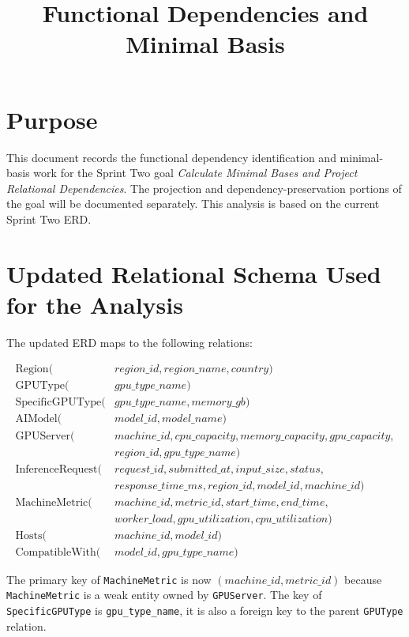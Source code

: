 \documentclass[11pt]{article}
\title{Functional Dependencies and Minimal Basis}
\author{}
\date{}
\newcommand{\code}[1]{\texttt{#1}}
\begin{document}
\maketitle

\section{Purpose}

This document records the functional dependency identification and minimal-basis
work for the Sprint Two goal \emph{Calculate Minimal Bases and Project Relational
Dependencies}. The projection and dependency-preservation portions of the goal
will be documented separately. This analysis is based on the current Sprint Two
ERD.


\section{Updated Relational Schema Used for the Analysis}

The updated ERD maps to the following relations:

\begin{align*}
\text{Region}(&region\_id, region\_name, country)\\
\text{GPUType}(&gpu\_type\_name)\\
\text{SpecificGPUType}(&gpu\_type\_name, memory\_gb)\\
\text{AIModel}(&model\_id, model\_name)\\
\text{GPUServer}(&machine\_id, cpu\_capacity, memory\_capacity, gpu\_capacity,\\
&region\_id, gpu\_type\_name)\\
\text{InferenceRequest}(&request\_id, submitted\_at, input\_size, status,\\
&response\_time\_ms, region\_id, model\_id, machine\_id)\\
\text{MachineMetric}(&machine\_id, metric\_id, start\_time, end\_time,\\
&worker\_load, gpu\_utilization, cpu\_utilization)\\
\text{Hosts}(&machine\_id, model\_id)\\
\text{CompatibleWith}(&model\_id, gpu\_type\_name)
\end{align*}

The primary key of \code{MachineMetric} is now $(machine\_id, metric\_id)$ because
\code{MachineMetric} is a weak entity owned by \code{GPUServer}. The key of
\code{SpecificGPUType} is \code{gpu\_type\_name}, it is also a foreign key to the
parent \code{GPUType} relation.
\end{document}
